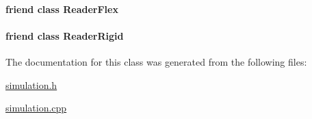 \hypertarget{classmknix_1_1_simulation_a1150cceac3e81192653459c61f428621}{
\paragraph[{Reader\-Flex}]{\setlength{\rightskip}{0pt plus 5cm}friend class {\bf Reader\-Flex}\hspace{0.3cm}{\ttfamily [friend]}}}\label{classmknix_1_1_simulation_a1150cceac3e81192653459c61f428621}
\hypertarget{classmknix_1_1_simulation_a6a45b3f2d8b6c9e516334b46caf0cbb7}{
\paragraph[{Reader\-Rigid}]{\setlength{\rightskip}{0pt plus 5cm}friend class {\bf Reader\-Rigid}\hspace{0.3cm}{\ttfamily [friend]}}}\label{classmknix_1_1_simulation_a6a45b3f2d8b6c9e516334b46caf0cbb7}


The documentation for this class was generated from the following files\-:\begin{DoxyCompactItemize}
\item 
\hyperlink{simulation_8h}{simulation.\-h}\item 
\hyperlink{simulation_8cpp}{simulation.\-cpp}\end{DoxyCompactItemize}
